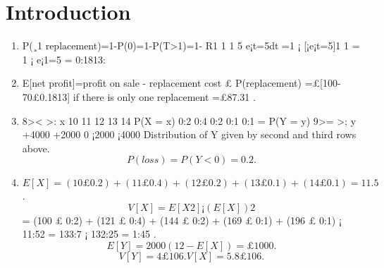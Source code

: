 \documentclass{article}
\begin{document}
\maketitle

\section{Introduction}

\begin{enumerate}
\item P(¸1 replacement)=1-P(0)=1-P(T>1)=1-
R1
1
1
5 e¡t=5dt
=1 ¡ [¡e¡t=5]1
1 = 1 ¡ e¡1=5 = 0:1813:

\item E[net profit]=profit on sale - replacement cost £ P(replacement)
=£[100-70£0.1813] if there is only one replacement
=£87.31 .
\item 
8><
>:
x 10 11 12 13 14
P(X = x) 0:2 0:4 0:2 0:1 0:1 = P(Y = y)
9>=
>;
y +4000 +2000 0 ¡2000 ¡4000
Distribution of Y given by second and third rows above.
\[P(loss)=P(Y<0)=0.2 .\]

\item \[E[X]=(10£0.2)+(11£0.4)+(12£0.2)+(13£0.1)+(14£0.1)=11.5 \].
\[V[X] = E[X2] ¡ (E[X])2\]
= (100 £ 0:2) + (121 £ 0:4) + (144 £ 0:2) + (169 £ 0:1) + (196 £ 0:1) ¡ 11:52
= 133:7 ¡ 132:25 = 1:45
.
\[E[Y]=2000(12-E[X])=£1000 .\]
\[V[Y]=4£106 . V[X]=5.8£106 .\]
\end{enumerate}
\end{document}
